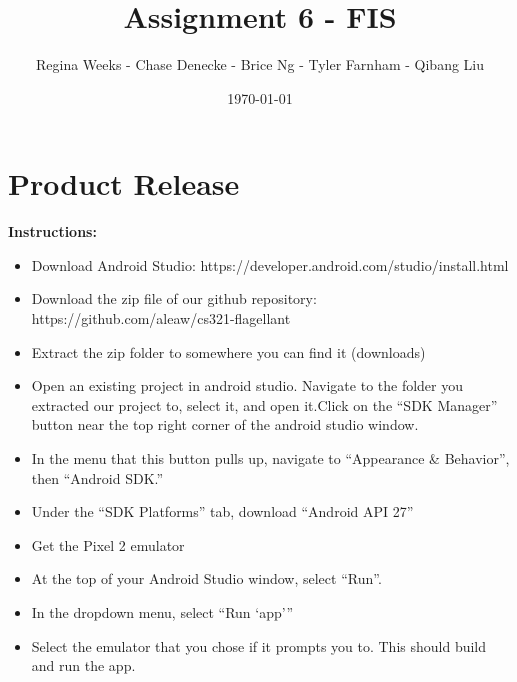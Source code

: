 \documentclass[a4paper]{article}
\title{Assignment 6 - FIS}
\author{Regina Weeks - Chase Denecke - Brice Ng - Tyler Farnham - Qibang Liu}
\date{\today}
\begin{document}
\maketitle
\section{Product Release}
\textbf{Instructions:}
\begin{itemize}
\item Download Android Studio: https://developer.android.com/studio/install.html
\item Download the zip file of our github repository: https://github.com/aleaw/cs321-flagellant
\item Extract the zip folder to somewhere you can find it (downloads)
\item Open an existing project in android studio. Navigate to the folder you extracted our project to, select it, and open it.Click on the “SDK Manager” button near the top right corner of the android studio window.
\item In the menu that this button pulls up, navigate to “Appearance \& Behavior”, then “Android SDK.”
\item Under the “SDK Platforms” tab, download “Android API 27”
\item Get the Pixel 2 emulator
\item At the top of your Android Studio window, select “Run”.
\item In the dropdown menu, select “Run ‘app’”
\item Select the emulator that you chose if it prompts you to. This should build and run the app.
\end{itemize}
\end{document}

